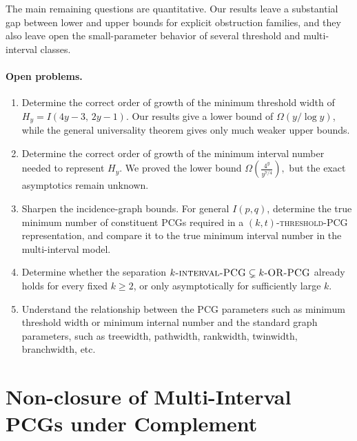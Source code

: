 \documentclass[a4paper,UKenglish,cleveref,autoref,thm-restate]{socg-lipics-v2021}
\begin{document}
The main remaining questions are quantitative. Our results leave a substantial gap
between lower and upper bounds for explicit obstruction families, and they also leave
open the small-parameter behavior of several threshold and multi-interval classes.

\paragraph*{Open problems.}
\begin{enumerate}
    \item Determine the correct order of growth of the minimum threshold width of
    \(
    H_y=I(4y-3,\,2y-1).
    \)
    Our results give a lower bound of \(\Omega(y/\log y)\), while the general universality theorem gives only much weaker upper bounds.

    \item Determine the correct order of growth of the minimum interval number needed to
    represent \(H_y\). We proved the lower bound
    \(
    \Omega\!\left(\frac{4^y}{y^{7/4}}\right),
    \)
    but the exact asymptotics remain unknown.

    \item Sharpen the incidence-graph bounds. For general \(I(p,q)\), determine the true
    minimum number of constituent \textsc{PCG}s required in a
    \textsc{$(k,t)$-threshold-\textsc{PCG}} representation, and compare it to the true
    minimum interval number in the multi-interval model.

    \item Determine whether the separation
    \(
    k\textsc{-interval-\textsc{PCG}} \subsetneq k\textsc{-OR-\textsc{PCG}}
    \)
    already holds for every fixed \(k\ge 2\), or only asymptotically for sufficiently
    large \(k\).
    \item Understand the relationship between the PCG parameters such as minimum threshold width or minimum internal number and the standard graph parameters, such as treewidth, pathwidth, rankwidth, twinwidth, branchwidth, etc. 
\end{enumerate}

%



\appendix


\section{Non-closure of Multi-Interval PCGs under Complement}
\label{app:kint}
\end{document}
